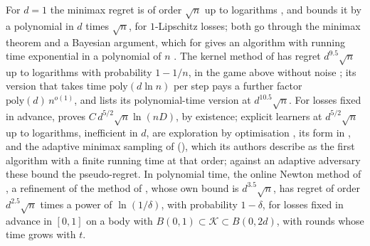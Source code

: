 \documentclass[11pt]{amsart}
\theoremstyle{definition}
\numberwithin{equation}{section}
\newcommand{\cK}{\mathcal{K}}
\begin{document}
For $d=1$ the minimax regret is of order $\sqrt n$ up to logarithms \cite{BDKP15}, and \cite[Theorem~1.3]{BE18} bounds it by a polynomial in $d$ times $\sqrt n$, for $1$-Lipschitz losses; both go through the minimax theorem and a Bayesian argument, which for \cite{BE18} gives an algorithm with running time exponential in a polynomial of $n$ \cite{BEL21}. The kernel method of \cite{BEL21} has regret $d^{9.5}\sqrt n$ up to logarithms with probability $1-1/n$, in the game above without noise \cite[Theorem~1]{BEL21}; its version that takes time $\mathrm{poly}(d\ln n)$ per step pays a further factor $\mathrm{poly}(d)\,n^{o(1)}$, and \cite[Section~2.5]{Lat24} lists its polynomial-time version at $d^{10.5}\sqrt n$. For losses fixed in advance, \cite[Theorem~1]{Lat20} proves $C\,d^{5/2}\sqrt n\ln(nD)$, by existence; explicit learners at $d^{5/2}\sqrt n$ up to logarithms, inefficient in $d$, are exploration by optimisation \cite[Section~8]{LG21}, its form in \cite[Section~8.5]{Lat24}, and the adaptive minimax sampling of \cite{XZ25} (\cite[Section~6.3]{XZ23}), which its authors describe as the first algorithm with a finite running time at that order; against an adaptive adversary these bound the pseudo-regret. In polynomial time, the online Newton method of \cite[Chapter~11]{Lat24}, a refinement of the method of \cite[Theorem~1]{FHLM24}, whose own bound is $d^{3.5}\sqrt n$, has regret of order $d^{2.5}\sqrt n$ times a power of $\ln(1/\delta)$, with probability $1-\delta$, for losses fixed in advance in $[0,1]$ on a body with $B(0,1)\subset\cK\subset B(0,2d)$, with rounds whose time grows with $t$.
\end{document}
